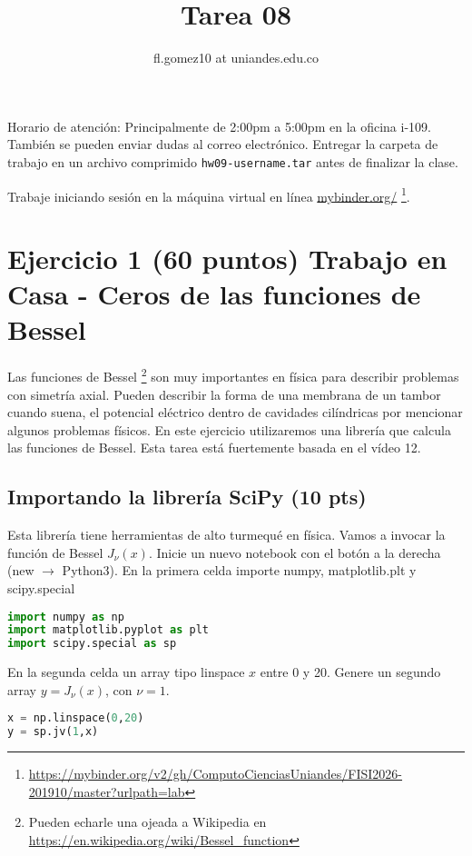 \documentclass{article}
\title{Tarea 08}
\author{fl.gomez10 at uniandes.edu.co}
\begin{document}
\maketitle

Horario de atención: Principalmente de 2:00pm a 5:00pm en la oficina i-109.
También se pueden enviar dudas al correo electrónico.
Entregar la carpeta de trabajo en un archivo comprimido \texttt{hw09-username.tar}
antes de finalizar la clase. 

Trabaje iniciando  sesión en la máquina virtual en línea
\href{https://mybinder.org/v2/gh/ComputoCienciasUniandes/FISI2026-201910/master?urlpath=lab}{mybinder.org/}
\footnote{\url{https://mybinder.org/v2/gh/ComputoCienciasUniandes/FISI2026-201910/master?urlpath=lab}}. 


\section{Ejercicio 1 (60 puntos) Trabajo en Casa - Ceros de las funciones de Bessel}

Las funciones de Bessel
\footnote{Pueden echarle una ojeada a Wikipedia en \url{https://en.wikipedia.org/wiki/Bessel_function}}
son muy importantes en física para describir problemas con simetría
axial. Pueden describir la forma de una membrana de un tambor cuando suena, el potencial
eléctrico dentro de cavidades cilíndricas por mencionar algunos problemas físicos.
En este ejercicio utilizaremos una librería que calcula las funciones de Bessel.
Esta tarea está fuertemente basada en el vídeo 12.

\subsection{Importando la librería SciPy (10 pts)}
Esta librería tiene herramientas de alto turmequé en física. Vamos a invocar la función de
Bessel $J_\nu(x)$. Inicie un nuevo notebook con el botón a la derecha (new $\rightarrow$ Python3).
En la primera celda importe numpy, matplotlib.plt y scipy.special

\begin{lstlisting}[language=Python]
import numpy as np
import matplotlib.pyplot as plt
import scipy.special as sp
\end{lstlisting}

En la segunda celda un array tipo linspace $x$ entre 0 y 20.
Genere un segundo array $y=J_\nu(x)$, con $\nu = 1$.
\begin{lstlisting}[language=Python]
x = np.linspace(0,20)
y = sp.jv(1,x)
\end{lstlisting}
\end{document}
